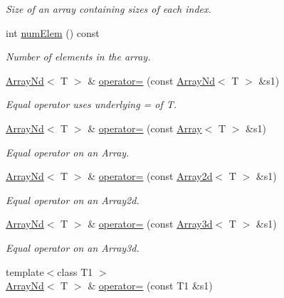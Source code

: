 \begin{DoxyCompactItemize}
\begin{DoxyCompactList}\small\item\em Size of an array containing sizes of each index. \end{DoxyCompactList}\item 
int \mbox{\hyperlink{classADAT_1_1ArrayNd_a5c33ae0e66b53a2fd86f804f0f4292e9}{num\+Elem}} () const
\begin{DoxyCompactList}\small\item\em Number of elements in the array. \end{DoxyCompactList}\item 
\mbox{\hyperlink{classADAT_1_1ArrayNd}{Array\+Nd}}$<$ T $>$ \& \mbox{\hyperlink{classADAT_1_1ArrayNd_ae3c6bdf408c630fc44a7c6dcdac94ae1}{operator=}} (const \mbox{\hyperlink{classADAT_1_1ArrayNd}{Array\+Nd}}$<$ T $>$ \&s1)
\begin{DoxyCompactList}\small\item\em Equal operator uses underlying = of T. \end{DoxyCompactList}\item 
\mbox{\hyperlink{classADAT_1_1ArrayNd}{Array\+Nd}}$<$ T $>$ \& \mbox{\hyperlink{classADAT_1_1ArrayNd_a3290ebbe75b40ebde8f3506f2aea64a5}{operator=}} (const \mbox{\hyperlink{classXMLArray_1_1Array}{Array}}$<$ T $>$ \&s1)
\begin{DoxyCompactList}\small\item\em Equal operator on an Array. \end{DoxyCompactList}\item 
\mbox{\hyperlink{classADAT_1_1ArrayNd}{Array\+Nd}}$<$ T $>$ \& \mbox{\hyperlink{classADAT_1_1ArrayNd_a95293530c9643394ae8133f0203d342b}{operator=}} (const \mbox{\hyperlink{classXMLArray_1_1Array2d}{Array2d}}$<$ T $>$ \&s1)
\begin{DoxyCompactList}\small\item\em Equal operator on an Array2d. \end{DoxyCompactList}\item 
\mbox{\hyperlink{classADAT_1_1ArrayNd}{Array\+Nd}}$<$ T $>$ \& \mbox{\hyperlink{classADAT_1_1ArrayNd_aa02a148fb7073245d21688eaa40d820b}{operator=}} (const \mbox{\hyperlink{classXMLArray_1_1Array3d}{Array3d}}$<$ T $>$ \&s1)
\begin{DoxyCompactList}\small\item\em Equal operator on an Array3d. \end{DoxyCompactList}\item 
{\footnotesize template$<$class T1 $>$ }\\\mbox{\hyperlink{classADAT_1_1ArrayNd}{Array\+Nd}}$<$ T $>$ \& \mbox{\hyperlink{classADAT_1_1ArrayNd_a4b2d8a768beccefe12844f27c50b058b}{operator=}} (const T1 \&s1)

\end{DoxyCompactItemize}
